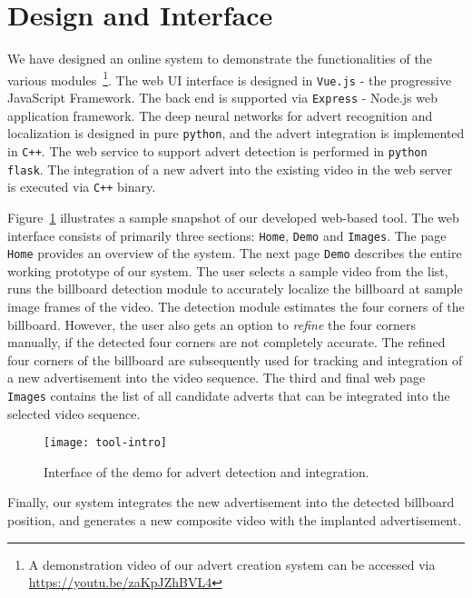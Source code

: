 \documentclass[runningheads]{llncs}
\begin{document}
\vspace{-0.2in}
\section{Design and Interface}
We have designed an online system to demonstrate the functionalities of the various modules~\footnote{A demonstration video of our advert creation system can be accessed via \url{https://youtu.be/zaKpJZhBVL4}}. The web UI interface is designed in \texttt{Vue.js} - the progressive JavaScript Framework. The back end is supported via \texttt{Express} - Node.js web application framework. The deep neural networks for advert recognition and localization is designed in pure \texttt{python}, and the advert integration is implemented in \texttt{C++}. The web service to support advert detection is performed in \texttt{python flask}. The integration of a new advert into the existing video in the web server is executed via \texttt{C++} binary.

Figure~\ref{fig:tool-interface} illustrates a sample snapshot of our developed web-based tool. The web interface consists of primarily three sections: \texttt{Home}, \texttt{Demo} and \texttt{Images}. The page \texttt{Home} provides an overview of the system. The next page \texttt{Demo} describes the entire working prototype of our system. The user selects a sample video from the list, runs the billboard detection module to accurately localize the billboard at sample image frames of the video. The detection module estimates the four corners of the billboard. However, the user also gets an option to \emph{refine} the four corners manually, if the detected four corners are not completely accurate. The refined four corners of the billboard are subsequently used for tracking and integration of a new advertisement into the video sequence. The third and final web page \texttt{Images} contains the list of all candidate adverts that can be integrated into the selected video sequence.

\begin{figure}[htb]
\vspace{-0.2in}
\centering
\texttt{[image: tool-intro]}
\caption{Interface of the demo for advert detection and integration.}
\label{fig:tool-interface}
\vspace{-0.3in}
\end{figure}

Finally, our system integrates the new advertisement into the detected billboard position, and generates a new composite video with the implanted advertisement. 
\vspace{-0.1in}
\end{document}
